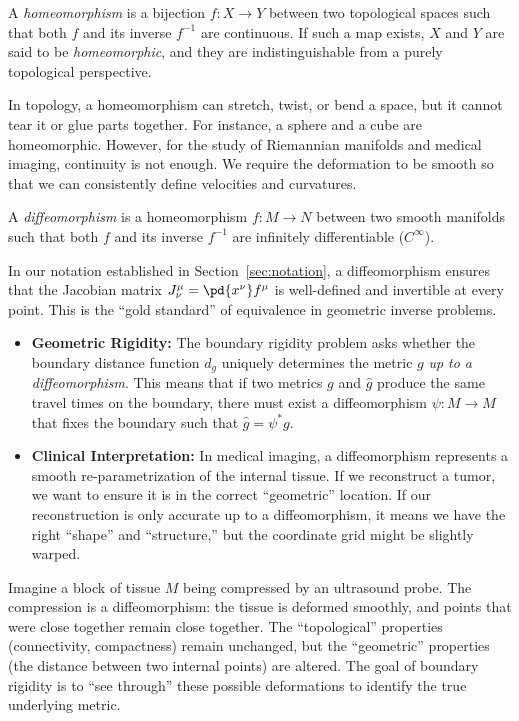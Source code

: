\begin{definition}
  A \emph{homeomorphism} is a bijection $f: X \to Y$ between two topological spaces such that both $f$ and its inverse $f^{-1}$ are continuous. If such a map exists, $X$ and $Y$ are said to be \emph{homeomorphic}, and they are indistinguishable from a purely topological perspective.
\end{definition}

In topology, a homeomorphism can stretch, twist, or bend a space, but it cannot tear it or glue parts together. For instance, a sphere and a cube are homeomorphic. However, for the study of Riemannian manifolds and medical imaging, continuity is not enough. We require the deformation to be smooth so that we can consistently define velocities and curvatures.

\begin{definition}
  A \emph{diffeomorphism} is a homeomorphism $f: M \to N$ between two smooth manifolds such that both $f$ and its inverse $f^{-1}$ are infinitely differentiable ($C^\infty$).
\end{definition}

In our notation established in Section~\ref{sec:notation}, a diffeomorphism ensures that the Jacobian matrix $J^\mu_\nu = \pd{x^\nu} f^\mu$ is well-defined and invertible at every point. This is the ``gold standard'' of equivalence in geometric inverse problems.

\begin{itemize}
  \item \textbf{Geometric Rigidity:} The boundary rigidity problem asks whether the boundary distance function $d_g$ uniquely determines the metric $g$ \emph{up to a diffeomorphism}. This means that if two metrics $g$ and $\hat{g}$ produce the same travel times on the boundary, there must exist a diffeomorphism $\psi: M \to M$ that fixes the boundary such that $\hat{g} = \psi^* g$.
  \item \textbf{Clinical Interpretation:} In medical imaging, a diffeomorphism represents a smooth re-parametrization of the internal tissue. If we reconstruct a tumor, we want to ensure it is in the correct ``geometric'' location. If our reconstruction is only accurate up to a diffeomorphism, it means we have the right ``shape'' and ``structure,'' but the coordinate grid might be slightly warped.
\end{itemize}

\begin{example}
  Imagine a block of tissue $M$ being compressed by an ultrasound probe. The compression is a diffeomorphism: the tissue is deformed smoothly, and points that were close together remain close together. The ``topological'' properties (connectivity, compactness) remain unchanged, but the ``geometric'' properties (the distance between two internal points) are altered. The goal of boundary rigidity is to ``see through'' these possible deformations to identify the true underlying metric.
\end{example}

